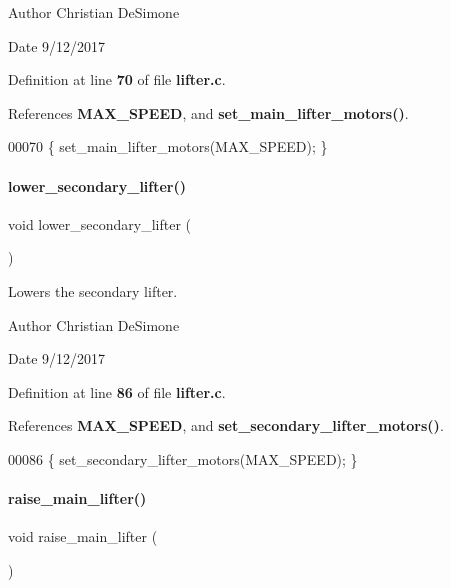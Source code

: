 \begin{DoxyAuthor}{Author}
Christian De\+Simone 
\end{DoxyAuthor}
\begin{DoxyDate}{Date}
9/12/2017 
\end{DoxyDate}


Definition at line \textbf{ 70} of file \textbf{ lifter.\+c}.



References \textbf{ M\+A\+X\+\_\+\+S\+P\+E\+ED}, and \textbf{ set\+\_\+main\+\_\+lifter\+\_\+motors()}.


\begin{DoxyCode}
00070 \{ set_main_lifter_motors(MAX_SPEED); \}
\end{DoxyCode}
\mbox{\label{a00026_af76abbd394bf206ab56fa237d776f2b3}} 
\paragraph{lower\+\_\+secondary\+\_\+lifter()}
{\footnotesize\ttfamily void lower\+\_\+secondary\+\_\+lifter (\begin{DoxyParamCaption}{ }\end{DoxyParamCaption})}



Lowers the secondary lifter. 

\begin{DoxyAuthor}{Author}
Christian De\+Simone 
\end{DoxyAuthor}
\begin{DoxyDate}{Date}
9/12/2017 
\end{DoxyDate}


Definition at line \textbf{ 86} of file \textbf{ lifter.\+c}.



References \textbf{ M\+A\+X\+\_\+\+S\+P\+E\+ED}, and \textbf{ set\+\_\+secondary\+\_\+lifter\+\_\+motors()}.


\begin{DoxyCode}
00086 \{ set_secondary_lifter_motors(MAX_SPEED); \}
\end{DoxyCode}
\mbox{\label{a00026_a2e2bd38b5b8b52378f3510368bf8aa0a}} 
\paragraph{raise\+\_\+main\+\_\+lifter()}
{\footnotesize\ttfamily void raise\+\_\+main\+\_\+lifter (\begin{DoxyParamCaption}{ }\end{DoxyParamCaption})}



